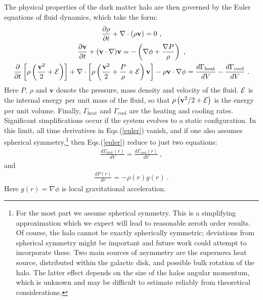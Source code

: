 \documentclass[12pt]{article}
\begin{document}
{{The physical properties of the dark matter halo are then governed by the
Euler equations of fluid dynamics, which take the form:
%
\begin{gather}
\frac{\partial \rho}{\partial t} + \nabla \cdot (\rho \mathbf{v}) = 0
\nonumber \ , \\
\frac{\partial \mathbf{v}}{\partial t} + (\mathbf{v} \cdot
\nabla)\mathbf{v} = -\left ( \nabla \phi + \frac{\nabla P}{\rho} \right)
\nonumber \ , \\
\frac{\partial}{\partial t} \left [\rho \left ( \frac{\mathbf{v}^2}{2} +
{\cal E} \right ) \right ] + \nabla \cdot \left [\rho \left (
\frac{\mathbf{v}^2}{2} + \frac{P}{\rho} + {\cal E} \right ) \mathbf{v}
\right ] - \rho \mathbf{v} \cdot \nabla \phi = \frac{d\Gamma
_{\text{heat}}}{dV} - \frac{d\Gamma _{\text{cool}}}{dV} \ .
\label{euler}
\end{gather}
%
Here $P$, $\rho$ and $\mathbf{v}$ denote the pressure, mass density and
velocity of the fluid. ${\cal E}$ is the internal energy per unit mass
of the fluid, so that $\rho \left (\mathbf{v}^2/2 + {\cal E} \right )$
is the energy per unit volume. Finally, $\Gamma _{\text{heat}}$ and
$\Gamma _{\text{cool}}$ are the heating and cooling rates. Significant
simplifications occur if the system evolves to a static configuration.
In this limit, all time derivatives in Eqs.(\ref{euler}) vanish, and if
one also assumes spherical symmetry,\footnote{
For the most part we assume spherical symmetry. This is a simplifying
approximation 
which we expect will lead to reasonable zeroth order results.
Of course, the halo cannot be exactly spherically symmetric; deviations
from spherical symmetry
might be important and future work could attempt to incorporate these.  
Two main sources of asymmetry are the supernova heat source,
distributed within the 
galactic disk, and possible bulk rotation of the halo.
The latter effect depends on the size of the halos angular momentum,
which is unknown and may be difficult to estimate
reliably from theoretical considerations.
} 
then Eqs.(\ref{euler}) reduce to just two equations:
%
\begin{eqnarray}
\frac{d\Gamma _{\text{heat}}(r)}{dV} = \frac{d\Gamma
_{\text{cool}}(r)}{dV} \ ,
\label{balance}
\end{eqnarray}
%
and
%
\begin{eqnarray}
\frac{dP(r)}{dr} = -\rho (r)g(r) \ .
\label{hydrostatic}
\end{eqnarray}
%
Here $g(r)=\nabla \phi$ is local gravitational acceleration.

}}
\end{document}

